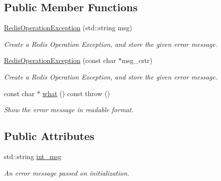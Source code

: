 \subsection*{Public Member Functions}
\begin{DoxyCompactItemize}
\item 
\hyperlink{structRedisOperationException_a54e07b6a7c4d81ab0cb4d1f61d5a6226}{Redis\+Operation\+Exception} (std\+::string msg)\hypertarget{structRedisOperationException_a54e07b6a7c4d81ab0cb4d1f61d5a6226}{}\label{structRedisOperationException_a54e07b6a7c4d81ab0cb4d1f61d5a6226}

\begin{DoxyCompactList}\small\item\em Create a Redis Operation Exception, and store the given error message. \end{DoxyCompactList}\item 
\hyperlink{structRedisOperationException_a330513962eb439159cf494f3996edc8c}{Redis\+Operation\+Exception} (const char $\ast$msg\+\_\+cstr)\hypertarget{structRedisOperationException_a330513962eb439159cf494f3996edc8c}{}\label{structRedisOperationException_a330513962eb439159cf494f3996edc8c}

\begin{DoxyCompactList}\small\item\em Create a Redis Operation Exception, and store the given error message. \end{DoxyCompactList}\item 
const char $\ast$ \hyperlink{structRedisOperationException_a629e013517496f9e14ae5286a8759043}{what} () const   throw ()\hypertarget{structRedisOperationException_a629e013517496f9e14ae5286a8759043}{}\label{structRedisOperationException_a629e013517496f9e14ae5286a8759043}

\begin{DoxyCompactList}\small\item\em Show the error message in readable format. \end{DoxyCompactList}\end{DoxyCompactItemize}
\subsection*{Public Attributes}
\begin{DoxyCompactItemize}
\item 
std\+::string \hyperlink{structRedisOperationException_ac5deeab2028bb95e7db928cfb222656e}{int\+\_\+msg}\hypertarget{structRedisOperationException_ac5deeab2028bb95e7db928cfb222656e}{}\label{structRedisOperationException_ac5deeab2028bb95e7db928cfb222656e}

\begin{DoxyCompactList}\small\item\em An error message passed on initialization. \end{DoxyCompactList}\end{DoxyCompactItemize}


